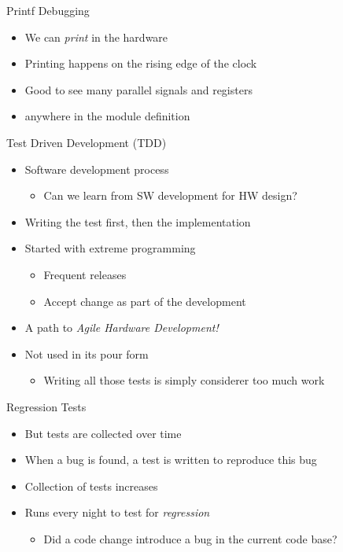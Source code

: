 \begin{frame}[fragile]{Printf Debugging}
\begin{itemize}
\item We can \emph{print} in the hardware
\item Printing happens on the rising edge of the clock
\item Good to see many parallel signals and registers
\item {} anywhere in the module definition
\end{itemize}
\end{frame}


\begin{frame}[fragile]{Test Driven Development (TDD)}
\begin{itemize}
\item Software development process
\begin{itemize}
\item Can we learn from SW development for HW design?
\end{itemize}
\item Writing the test first, then the implementation
\item Started with extreme programming
\begin{itemize}
\item Frequent releases
\item Accept change as part of the development
\end{itemize}
\item A path to \emph{Agile Hardware Development!}
\item Not used in its pour form
\begin{itemize}
\item Writing all those tests is simply considerer too much work
\end{itemize}
\end{itemize}
\end{frame}

\begin{frame}[fragile]{Regression Tests}
\begin{itemize}
\item But tests are collected over time
\item When a bug is found, a test is written to reproduce this bug
\item Collection of tests increases
\item Runs every night to test for \emph{regression}
\begin{itemize}
\item Did a code change introduce a bug in the current code base?
\end{itemize}
\end{itemize}
\end{frame}


